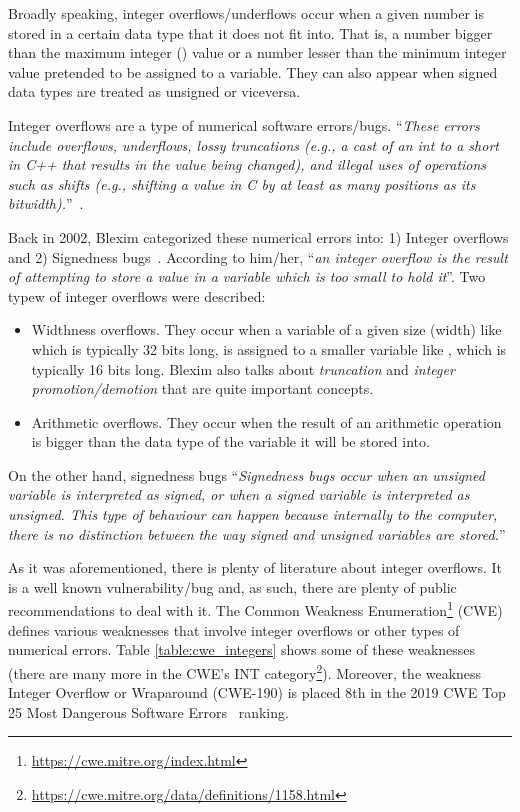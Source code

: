 Broadly speaking, integer overflows/underflows occur when a given number is stored in a certain data type that it does not fit into. That is, a number bigger than the maximum integer () value or a number lesser than the minimum integer value pretended to be assigned to a  variable. They can also appear when signed data types are treated as unsigned or viceversa. 

Integer overflows are a type of numerical software errors/bugs. ``\textit{These errors include
overflows, underflows, lossy truncations (e.g., a cast of an
int to a short in C++ that results in the value being
changed), and illegal uses of operations such as shifts (e.g.,
shifting a value in C by at least as many positions as its
bitwidth).}''~\cite{dietz2015understanding}.

Back in 2002, Blexim categorized these numerical errors into: 1) Integer overflows and 2) Signedness bugs~\cite{Blexim2002}. According to him/her, ``\textit{an integer overflow is the result of attempting to store a value in a variable which is too small to hold it}''. Two typew of integer overflows were described:
\begin{itemize}
	\item{Widthness overflows. They occur when a variable of a given size (width) like  which is typically 32 bits long, is assigned to a smaller variable like , which is typically 16 bits long. Blexim also talks about \textit{truncation} and \textit{integer promotion/demotion} that are quite important concepts. }
	\item{Arithmetic overflows. They occur when the result of an arithmetic operation is bigger than the data type of the variable it will be stored into.}
\end{itemize}

On the other hand, signedness bugs ``\textit{Signedness bugs occur when an unsigned variable is interpreted as signed, or when a signed variable is interpreted as unsigned.  This type of behaviour can happen because internally to the computer, there is no distinction between the way signed and unsigned variables are stored.}''

As it was aforementioned, there is plenty of literature about integer overflows. It is a well known vulnerability/bug and, as such, there are plenty of public recommendations to deal with it. The Common Weakness Enumeration\footnote{\url{https://cwe.mitre.org/index.html}} (CWE)   defines various weaknesses that involve integer overflows or other types of numerical errors. Table \ref{table:cwe_integers} shows some of these weaknesses (there are many more in the CWE's INT category\footnote{\url{https://cwe.mitre.org/data/definitions/1158.html}}). Moreover, the weakness Integer Overflow or Wraparound (CWE-190) is placed 8th in the 2019 CWE Top 25 Most Dangerous Software Errors~\cite{Top25CWE2019} ranking.

